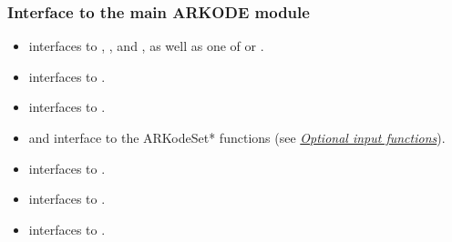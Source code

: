 \documentclass[letterpaper,10pt,english]{sphinxmanual}
\begin{document}
\subsubsection{Interface to the main ARKODE module}
\label{f_interface/Routines:interface-to-the-main-arkode-module}\begin{itemize}
\item {} 
{\hyperref[f_interface/Usage:f/_/FARKMALLOC]{}} interfaces to {\hyperref[c_interface/User_callable:ARKodeCreate]{}},
{\hyperref[c_interface/User_callable:ARKodeSetUserData]{}}, and {\hyperref[c_interface/User_callable:ARKodeInit]{}}, as well
as one of {\hyperref[c_interface/User_callable:ARKodeSStolerances]{}} or {\hyperref[c_interface/User_callable:ARKodeSVtolerances]{}}.

\item {} 
{\hyperref[f_interface/Usage:f/_/FARKREINIT]{}} interfaces to {\hyperref[c_interface/User_callable:ARKodeReInit]{}}.

\item {} 
{\hyperref[f_interface/Usage:f/_/FARKRESIZE]{}} interfaces to {\hyperref[c_interface/User_callable:ARKodeResize]{}}.

\item {} 
{\hyperref[f_interface/Usage:f/_/FARKSETIIN]{}} and {\hyperref[f_interface/Usage:f/_/FARKSETRIN]{}} interface to the
ARKodeSet* functions (see {\hyperref[c_interface/User_callable:cinterface-optionalinputs]{\emph{Optional input functions}}}).

\item {} 
{\hyperref[f_interface/Usage:f/_/FARKEWTSET]{}} interfaces to {\hyperref[c_interface/User_callable:ARKodeWFtolerances]{}}.

\item {} 
{\hyperref[f_interface/Usage:f/_/FARKADAPTSET]{}} interfaces to {\hyperref[c_interface/User_callable:ARKodeSetAdaptivityFn]{}}.

\item {} 
{\hyperref[f_interface/Usage:f/_/FARKEXPSTABSET]{}} interfaces to {\hyperref[c_interface/User_callable:ARKodeSetStabilityFn]{}}.

\end{itemize}
\end{document}
